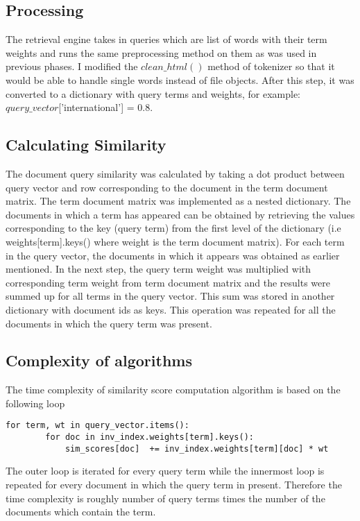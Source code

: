 \documentclass[paper=a4, fontsize=11pt]{scrartcl}
\numberwithin{equation}{section}		%
\numberwithin{figure}{section}			%
\numberwithin{table}{section}				%
\begin{document}
\subsection{Processing}

The retrieval engine takes in queries which are list of words with their term weights and runs the same preprocessing method on them as was used in previous phases. I modified the $clean\_html()$ method of tokenizer so that it would be able to handle single words instead of file objects. After this step, it was converted to a dictionary with query terms and weights, for example: $query\_vector$['international'] = 0.8.  

\subsection{Calculating Similarity}

The document query similarity was calculated by taking a dot product between query vector and row corresponding to the document in the term document matrix. The term document matrix was implemented as a nested dictionary. The documents in which a term has appeared can be obtained by retrieving the values corresponding to the key (query term) from the first level of the dictionary (i.e weights[term].keys() where weight is the term document matrix). For each term in the query vector, the documents in which it appears was obtained as earlier mentioned. In the next step, the query term weight was multiplied with corresponding term weight from term document matrix and the results were summed up for all terms in the query vector. This sum was stored in another dictionary with document ids as keys. This operation was repeated for all the documents in which the query term was present.

\subsection{Complexity of algorithms}

The time complexity of similarity score computation algorithm is based on the following loop

\begin{verbatim}
for term, wt in query_vector.items():
        for doc in inv_index.weights[term].keys():
            sim_scores[doc]  += inv_index.weights[term][doc] * wt
\end{verbatim}

The outer loop is iterated for every query term while the innermost loop is repeated for every document in which the query term in present. Therefore the time complexity is roughly number of query terms times the number of the documents which contain the term. 
\end{document}
